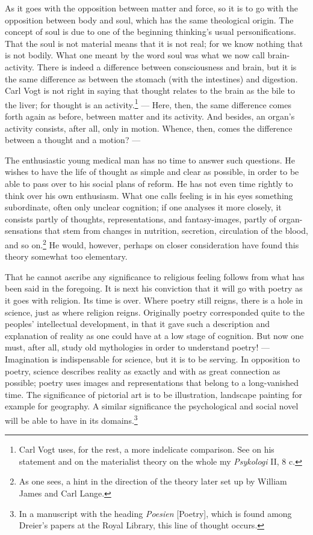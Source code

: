 \documentclass[12pt,a4paper]{book}
\newcommand{\opage}[1]{\marginnote{\footnotesize\textit{[#1]}}}
\begin{document}
As it goes with the opposition between matter and force, so it is to go with the opposition
between body and soul, which has the same theological origin. The concept of soul \opage{180}is due to
one of the beginning thinking's usual personifications. That the soul is not material means
that it is not real; for we know nothing that is not bodily. What one meant by the word soul
was what we now call brain-activity. There is indeed a difference between consciousness and
brain, but it is the same difference as between the stomach (with the intestines) and
digestion. Carl Vogt is not right in saying that thought relates to the brain as the bile to
the liver; for thought is an activity.\footnote{Carl Vogt uses, for the rest, a more indelicate
comparison. See on his statement and on the materialist theory on the whole my \emph{Psykologi}
II, 8 c.} --- Here, then, the same difference comes forth again as before, between matter and
its activity. And besides, an organ's activity consists, after all, only in motion. Whence,
then, comes the difference between a thought and a motion? ---

The enthusiastic young medical man has no time to answer such questions. He wishes to have the
life of thought as simple and clear as possible, in order to be able to pass over to his
social plans of reform. He has not even time rightly to think over his own enthusiasm. What
one calls feeling is in his eyes something subordinate, often only unclear cognition; if one
analyses it more closely, it consists partly of thoughts, representations, and fantasy-images,
partly of organ-sensations that stem from changes in nutrition, secretion, circulation of the
blood, and so on.\footnote{As one sees, a hint in the direction of the theory later set up by
William James and Carl Lange.} He would, however, perhaps on closer consideration have found
this theory somewhat too elementary.

That he cannot ascribe any significance to religious feeling follows from what has been said
in the foregoing. It is next his conviction that it will go with poetry as it goes with
religion. Its time is over. Where poetry still reigns, there is a hole in science, just as
where religion reigns. Originally poetry corresponded quite to the peoples' intellectual
development, in that it gave such a description and explanation of reality as one could have
at a low stage of \opage{181}cognition. But now one must, after all, study old mythologies in order to
understand poetry! --- Imagination is indispensable for science, but it is to be serving. In
opposition to poetry, science describes reality as exactly and with as great connection as
possible; poetry uses images and representations that belong to a long-vanished time. The
significance of pictorial art is to be illustration, landscape painting for example for
geography. A similar significance the psychological and social novel will be able to have in
its domains.\footnote{In a manuscript with the heading \emph{Poesien} [Poetry], which is found
among Dreier's papers at the Royal Library, this line of thought occurs.}
\end{document}
